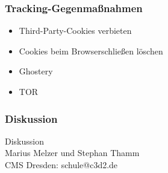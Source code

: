 \documentclass[12pt]{beamer}
\begin{document}
\begin{frame}
    \frametitle{Tracking-Gegenmaßnahmen}
    \begin{itemize}
      \item<1-> Third-Party-Cookies verbieten
      \item<2-> Cookies beim Browserschließen löschen
      \item<3-> Ghostery
      \item<4-> TOR
    \end{itemize}
\end{frame}

\begin{frame}
    \frametitle{Diskussion}
    \begin{center} {\Large Diskussion}\\Marius Melzer und Stephan Thamm\\CMS Dresden: schule@c3d2.de \end{center}
\end{frame}
\end{document}
